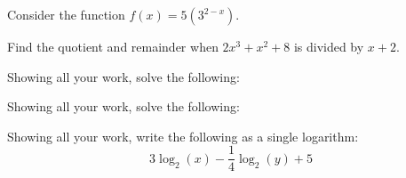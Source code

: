 \documentclass[12pt,letterpaper]{exam}
\begin{document}
\begin{questions}
\question Consider the function $f(x)= 5 \left(3^{2 - x} \right)$.



\newpage
\question[10] Find the quotient and remainder when $2x^3 + x^2 + 8$ is divided by $x + 2$. 



\newpage
\question[10] Showing all your work, solve the following: \par\vspace{0.5cm}



\newpage
\question[10] Showing all your work, solve the following: \par\vspace{0.5cm}



\newpage
\question[8] Showing all your work, write the following as a single logarithm:
	\[
	3\log_2(x) - \frac{1}{4} \log_2(y) + 5
	\] \par\vspace{8cm}




\end{questions}
\end{document}
